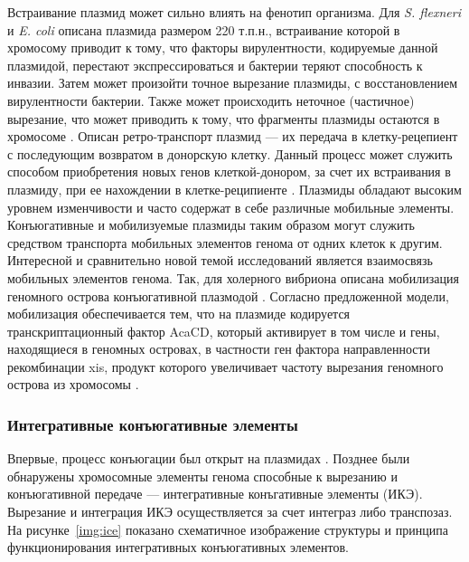 Встраивание плазмид может сильно влиять на фенотип организма. Для \textit{S. flexneri} и \textit{E. coli} описана плазмида размером 220 т.п.н., встраивание которой в хромосому приводит к тому, что факторы вирулентности, кодируемые данной плазмидой, перестают экспрессироваться и бактерии теряют способность к инвазии. Затем может произойти точное вырезание плазмиды, с восстановлением вирулентности бактерии. Также может происходить неточное (частичное) вырезание, что может приводить к тому, что фрагменты плазмиды остаются в хромосоме \cite{myers2006role}. Описан ретро-транспорт плазмид --- их передача в клетку-рецепиент с последующим возвратом в донорскую клетку. Данный процесс может служить способом приобретения новых генов клеткой-донором, за счет их встраивания в плазмиду, при ее нахождении в клетке-реципиенте \cite{ronchel2000retrotransfer}. Плазмиды обладают высоким уровнем изменчивости и часто содержат в себе различные мобильные элементы. Конъюгативные и мобилизуемые плазмиды таким образом могут служить средством транспорта мобильных элементов генома от одних клеток к другим. Интересной и сравнительно новой темой исследований является взаимосвязь мобильных элементов генома. Так, для холерного вибриона описана мобилизация геномного острова конъюгативной плазмодой \cite{carraro2016inca}. Согласно предложенной модели, мобилизация обеспечивается тем, что на плазмиде кодируется транскриптационный фактор AcaCD, который активирует в том числе и гены, находящиеся в геномных островах, в частности ген фактора направленности рекомбинации xis, продукт которого увеличивает частоту вырезания геномного острова из хромосомы \cite{carraro2017mobilizable}. 

\subsubsection{Интегративные конъюгативные элементы}
Впервые, процесс конъюгации был открыт на плазмидах \cite{lederberg1946gene}. Позднее были обнаружены хромосомные элементы генома способные к вырезанию и конъюгативной передаче --- интегративные конъгативные элементы (ИКЭ)\cite{burrus2002icest1}. Вырезание и интеграция ИКЭ осуществляется за счет интеграз либо транспозаз. На рисунке~\ref{img:ice} показано схематичное изображение структуры и принципа функционирования интегративных конъюгативных элементов. 

